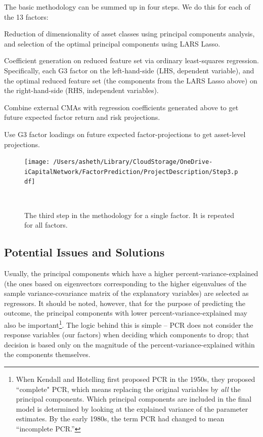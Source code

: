 \documentclass{ledger}
\begin{document}
The basic methodology can be summed up in four steps. We do this for each of the 13 factors:
\begin{compactenum}
	\item Reduction of dimensionality of asset classes using principal components analysis, and selection of the optimal principal components using LARS Lasso. 
	\item Coefficient generation on reduced feature set via ordinary least-squares regression. Specifically, each G3 factor on the left-hand-side (LHS, dependent variable), and the optimal reduced feature set (the components from the LARS Lasso above) on the right-hand-side (RHS, independent variables). 
	\item Combine external CMAs with regression coefficients generated above to get future expected factor return and risk projections.  
	\item Use G3 factor loadings on future expected factor-projections to get asset-level projections. \\
\end{compactenum}

\begin{figure}[!ht]
\centering
	\texttt{[image: /Users/asheth/Library/CloudStorage/OneDrive-iCapitalNetwork/FactorPrediction/ProjectDescription/Step3.pdf]}
	\caption{The third step in the methodology for a single factor. It is repeated for all factors.} ~\\
\end{figure}

\subsection{Potential Issues and Solutions}

Usually, the principal components which have a higher percent-variance-explained (the ones based on eigenvectors corresponding to the higher eigenvalues of the sample variance-covariance matrix of the explanatory variables) are selected as regressors. It should be noted, however, that for the purpose of predicting the outcome, the principal components with lower percent-variance-explained may also be important\footnote{When Kendall and Hotelling first proposed PCR in the 1950s, they proposed ``complete" PCR, which means replacing the original variables by \textit{all} the principal components. Which principal components are included in the final model is determined by looking at the explained variance of the parameter estimates. By the early 1980s, the term PCR had changed to mean ``incomplete PCR.''}. The logic behind this is simple -- PCR does not consider the response variables (our factors) when deciding which components to drop; that decision is based only on the magnitude of the percent-variance-explained within the components themselves.\\
\end{document}
